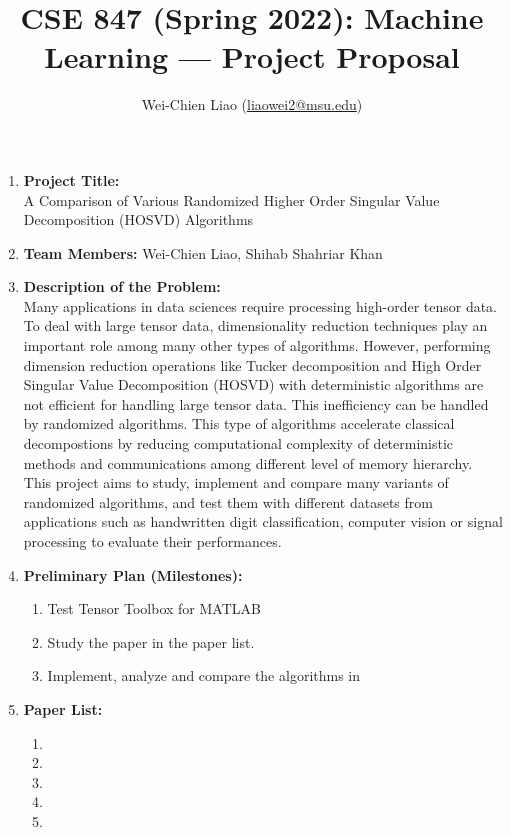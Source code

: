 \documentclass[12pt,a4paper]{article}
\title{\textbf{\large{CSE 847 (Spring 2022): Machine Learning --- Project Proposal}}}
\author{Wei-Chien Liao (\href{mailto:liaowei2@msu.edu}{liaowei2@msu.edu})}
\date{}
\begin{document}

\maketitle
\begin{enumerate}
    \item \textbf{Project Title:}\\
    A Comparison of Various Randomized Higher Order Singular Value Decomposition (HOSVD) Algorithms
    \item \textbf{Team Members:} Wei-Chien Liao, Shihab Shahriar Khan
    \item \textbf{Description of the Problem:}\\
    Many applications in data sciences require processing high-order tensor data. To deal
    with large tensor data, dimensionality reduction techniques play an important role among many other types of algorithms. However,
    performing dimension reduction operations like Tucker decomposition and High Order Singular Value Decomposition (HOSVD)
    with deterministic algorithms are not efficient for handling large tensor data. This inefficiency can be
    handled by randomized algorithms. This type of algorithms accelerate classical decompostions by reducing computational complexity
    of deterministic methods and communications among different level of memory hierarchy. This project aims to study, implement and compare
    many variants of randomized algorithms, and test them with different datasets from applications such as handwritten digit classification, computer vision or signal processing 
    to evaluate their performances.
    \item \textbf{Preliminary Plan (Milestones):}
    \begin{enumerate}
        \item Test Tensor Toolbox for MATLAB
        \item Study the paper \cite{9350569} in the paper list.
        \item Implement, analyze and compare the algorithms in \cite{9350569}
    \end{enumerate}
    \item \textbf{Paper List:}
    \begin{enumerate}
        \item[\cite{9350569}] 
        \item[\cite{ma2021fast}] 
        \item[\cite{Brett2021}] 
        \item[\cite{Minster2020}]    
        \item[\cite{Kolda2009}] 
    \end{enumerate}
\end{enumerate}
\end{document}
